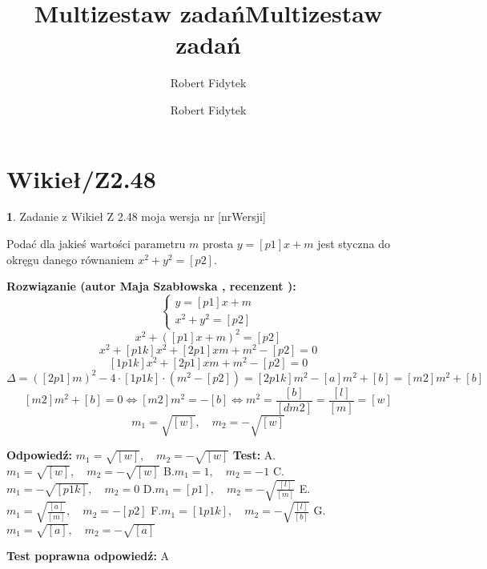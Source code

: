 \documentclass[12pt, a4paper]{article}
\title{Multizestaw zadań}
\author{Robert Fidytek}
\date{}\documentclass[12pt, a4paper]{article}
\title{Multizestaw zadań}
\author{Robert Fidytek}
\date{}
\theoremstyle{definition} %
\newtheorem{zad}{}
\theoremstyle{definition} %
\newtheorem{zad}{}
\newcommand{\kategoria}[1]{\section{#1}} %
\newcommand{\zadStart}[1]{\begin{zad}#1\newline} %
\newcommand{\zadStop}{\end{zad}}   %
\newcommand{\rozwStart}[2]{\noindent \textbf{Rozwiązanie (autor #1 , recenzent #2): }\newline} %
\newcommand{\rozwStop}{\newline}                                            %
\newcommand{\odpStart}{\noindent \textbf{Odpowiedź:}\newline}    %
\newcommand{\odpStop}{\newline}                                             %
\newcommand{\testStart}{\noindent \textbf{Test:}\newline} %
\newcommand{\testStop}{\newline} %
\newcommand{\kluczStart}{\noindent \textbf{Test poprawna odpowiedź:}\newline} %
\newcommand{\kluczStop}{\newline} %
\begin{document}
\maketitle


\kategoria{Wikieł/Z2.48}
\zadStart{Zadanie z Wikieł Z 2.48 moja wersja nr [nrWersji]}


Podać dla jakieś wartości parametru $m$ prosta $y=[p1]x+m$ jest styczna do okręgu danego równaniem $x^{2}+y^{2}=[p2].$

\zadStop

\rozwStart{Maja Szabłowska}{}
$$ \left\{ \begin{array}{ll}
y=[p1]x+m \\
x^{2}+y^{2}=[p2]
\end{array} \right.$$
$$x^{2}+([p1]x+m)^{2}=[p2]$$
$$x^{2}+[p1k]x^{2}+[2p1]xm+m^{2}-[p2]=0$$
$$[1p1k]x^{2}+[2p1]xm+m^{2}-[p2]=0$$
$$\Delta=([2p1]m)^{2}-4\cdot[1p1k]\cdot(m^{2}-[p2])=[2p1k]m^{2}-[a]m^{2}+[b]=[m2]m^{2}+[b]$$
$$[m2]m^{2}+[b]=0 \iff [m2]m^{2}=-[b] \iff m^{2}=\frac{[b]}{[dm2]}=\frac{[l]}{[m]}=[w]$$
$$m_{1}=\sqrt{[w]}, \quad m_{2}=-\sqrt{[w]}$$
\rozwStop


\odpStart
$m_{1}=\sqrt{[w]}, \quad m_{2}=-\sqrt{[w]}$
\odpStop
\testStart
A.$m_{1}=\sqrt{[w]}, \quad m_{2}=-\sqrt{[w]}$
B.$m_{1}=1, \quad m_{2}=-1$
C.$m_{1}=-\sqrt{[p1k]}, \quad m_{2}=0$
D.$m_{1}=[p1], \quad m_{2}=-\sqrt{\frac{[l]}{[m]}}$
E.$m_{1}=\sqrt{\frac{[a]}{[m]}}, \quad m_{2}=-[p2]$
F.$m_{1}=[1p1k], \quad m_{2}=-\sqrt{\frac{[l]}{[b]}}$
G.$m_{1}=\sqrt{[a]}, \quad m_{2}=-\sqrt{[a]}$

\testStop
\kluczStart
A
\kluczStop
\end{document}

